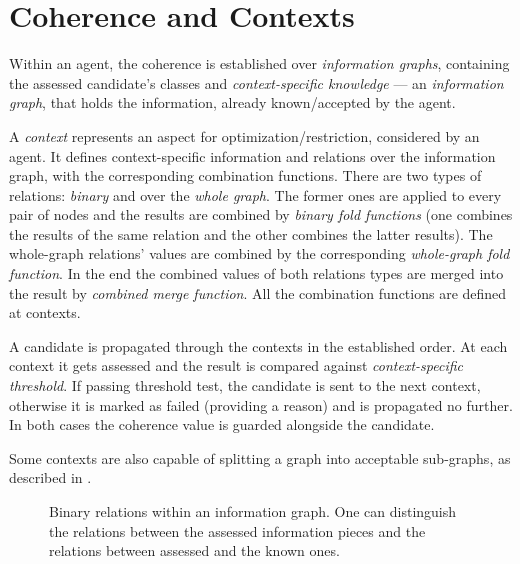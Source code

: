 





%


\section{Coherence and Contexts}
\label{section:coherence}


Within an agent, the coherence is established over \emph{information graphs},
containing the assessed candidate's classes and \emph{context-specific
  knowledge} --- an \emph{information graph}, that holds the information,
already known/accepted by the agent.


A \emph{context} represents an aspect for optimization/restriction, considered
by an agent. It defines context-specific information and relations over the
information graph, with the corresponding combination functions. There are
two types of relations: \emph{binary} and over the \emph{whole graph}. The former ones
are applied to every pair of nodes and the results are combined by 
\emph{binary fold functions} (one combines the results of the same relation
and the other combines the latter results). The whole-graph relations' values are
combined by the corresponding \emph{whole-graph fold function}. In the end the
combined values of both relations types are merged into the result by
\emph{combined merge function}. All the combination functions are defined at
contexts.

A candidate is propagated through the contexts in the established
order. At each context it gets assessed and the result is compared
against \emph{context-specific threshold}. If passing threshold test,
the candidate is sent to the next context, otherwise it is marked as failed
(providing a reason) and is propagated no further. In both cases the coherence
value is guarded alongside the candidate.

Some contexts are also capable of splitting a graph into acceptable
sub-graphs, as described in \cite{UAB-Thesis}.
 

\begin{figure}[H]
  \centering
  \fbox{  }
  \caption{Binary relations within an information graph. One can
           distinguish the relations between the assessed information pieces
           and the relations between assessed and the known ones.
          }
\end{figure}


